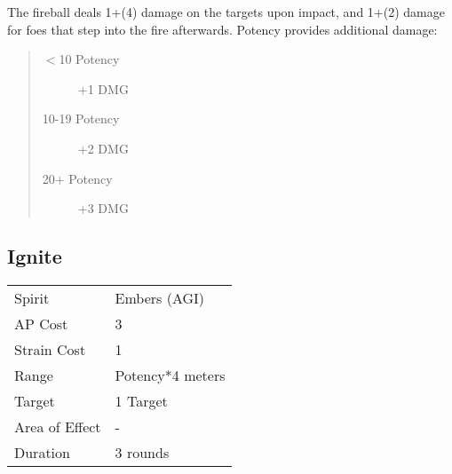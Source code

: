 \documentclass[11pt,a4paper,twocolumn]{book}
\begin{document}
The fireball deals 1+(4) damage on the targets upon impact, and 1+(2) damage for foes that step into the fire afterwards. Potency provides additional damage: 

\begin{quote}
	\begin{description}
		\item[$<$10 Potency] 	+1 DMG
		\item[10-19 Potency] 	+2 DMG
		\item[20+ Potency]  	+3 DMG
	\end{description}	
\end{quote}

%	
%
%
%

\subsection*{Ignite}
{
	\begin{tabu} to 70mm{| X[l,4] | X[l,7] |}
		\hline
		Spirit         & Embers (AGI)     \\
		AP Cost        & 3                \\
		Strain Cost    & 1                \\
		Range          & Potency*4 meters \\
		Target         & 1 Target         \\
		Area of Effect & -                \\
		Duration       & 3 rounds         \\ \hline
	\end{tabu}
	
}
\medskip
\end{document}
